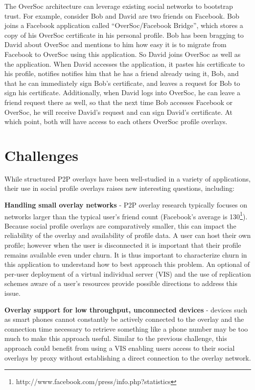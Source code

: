 The OverSoc architecture can leverage existing social networks to bootstrap
trust.  For example, consider Bob and David are two friends on Facebook.  Bob
joins a Facebook application called ``OverSoc/Facebook Bridge'', which stores
a copy of his OverSoc certificate in his personal profile.  Bob has been
bragging to David about OverSoc and mentions to him how easy it is to migrate
from Facebook to OverSoc using this application.  So David joins OverSoc as
well as the application.  When David accesses the application, it pastes his
certificate to his profile, notifies notifies him that he has a friend already
using it, Bob, and that he can immediately sign Bob's certificate, and leaves a
request for Bob to sign his certificate.  Additionally, when David logs into
OverSoc, he can leave a friend request there as well, so that the next time
Bob accesses Facebook or OverSoc, he will receive David's request and can sign
David's certificate.  At which point, both will have access to each others
OverSoc profile overlays.  

\section{Challenges}
\label{vpo:outstanding}

While structured P2P overlays have been well-studied in a variety of
applications, their use in social profile overlays raises new interesting
questions, including:

{\bf Handling small overlay networks} - P2P overlay research typically focuses
on networks larger than the typical user's friend count (Facebook's average is
130\footnote{http://www.facebook.com/press/info.php?statistics}).  Because
social profile overlays are comparatively smaller, this can impact the
reliability of the overlay and availability of profile data.  A user can host
their own profile; however when the user is disconnected it is important that
their profile remains available even under churn. It is thus important to
characterize churn in this application to understand how to best approach this
problem. An optional of per-user deployment of a virtual individual server
(VIS) and the use of replication schemes aware of a user's resources provide
possible directions to address this issue.

{\bf Overlay support for low throughput, unconnected devices} - devices such as
smart phones cannot constantly be actively connected to the overlay and the
connection time necessary to retrieve something like a phone number may be too
much to make this approach useful.  Similar to the previous challenge, this
approach could benefit from using a VIS enabling users access to their social
overlays by proxy without establishing a direct connection to the overlay
network.

